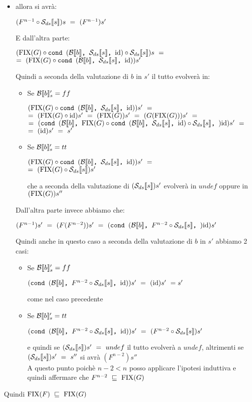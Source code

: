 {\begin{itemize}
\begin{itemize}
			\item {} allora si avrà:
			\begin{center}
			$(F^{n-1} \circ \Sds{})s~=~(F^{n-1})s'$
			\end{center}
			E dall'altra parte:
			\begin{center}
			$(\fixp{G} \circ \cond{b}{\Sds{}}{\idDS} \circ{} \Sds{})s~=$\\
			$=~(\fixp{G} \circ \cond{b}{\Sds{}}{\idDS})s'$
			\end{center}
			Quindi a seconda della valutazione di $b$ in $s'$ il tutto evolverà
			in:
			\begin{itemize}
			\item Se $\evalBbs{b}{s'}=ff$
			\begin{center}
			$(\fixp{G} \circ \cond{b}{\Sds{}}{\idDS})s'~=$\\
			$=~(\fixp{G} \circ \idDS)s'~=~(\fixp{G})s'~=~(G(\fixp{G}))s'~=$\\
			$=~(\cond{b}{\fixp{G} \circ \cond{b}{\Sds{}}{\idDS} \circ{} \Sds{}}
			{\idDS})s'~=$\\$=~(\idDS)s'~=~s'$
			\end{center}

			\item Se $\evalBbs{b}{s'}=tt$
			\begin{center}
			$(\fixp{G} \circ \cond{b}{\Sds{}}{\idDS})s'~=$\\
			$=~(\fixp{G} \circ \Sds{})s'$
			\end{center}
			che a seconda della valutazione di $(\Sds{})s'$ evolverà in $undef$
			oppure in $(\fixp{G})s''$
			\end{itemize}

			Dall'altra parte invece abbiamo che:
			\begin{center}
			$(F^{n-1})s'~=~(F(F^{n-2}))s'~=~(\cond{b}{F^{n-2} \circ \Sds{}}
			{\idDS})s'$
			\end{center}
			Quindi anche in questo caso a seconda della valutazione di $b$ in
			$s'$ abbiamo 2 casi:
			\begin{itemize}
			\item Se $\evalBbs{b}{s'}=ff$
			\begin{center}
			$(\cond{b}{F^{n-2} \circ \Sds{}}{\idDS})s'~=~(\idDS)s'~=s'$
			\end{center}
			come nel caso precedente
			\item Se $\evalBbs{b}{s'}=tt$
			\begin{center}
			$(\cond{b}{F^{n-2} \circ \Sds{}}{\idDS})s'~=~(F^{n-2} \circ \Sds{})s'$
			\end{center}
			e quindi se $(\Sds{})s'~=~undef$ il tutto evolverà a $undef$, altrimenti se $(\Sds{})s'~=~s''$ si avrà $(F^{n-2})s''$\\
			A questo punto poichè $n-2<n$ posso applicare l'ipotesi induttiva e quindi affermare che $F^{n-2}~\mineq~\fixp{G}$
			\end{itemize}

		\end{itemize}

	\end{itemize}
	Quindi $\fixp{F}~\mineq~\fixp{G}$
}
